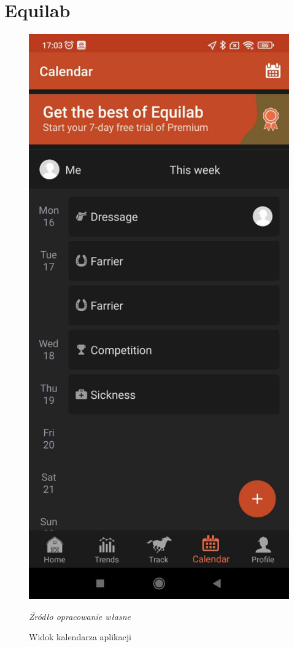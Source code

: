 \documentclass[12pt,oneside]{report}
\begin{document}
\section{Equilab}
\begin{figure}
	\centering
	\includegraphics[scale=0.15]{equilab1}
	\caption{Widok kalendarza aplikacji}
	\textit{Źródło opracowanie własne}
	\label{Equilab}
\end{figure}
\end{document}
